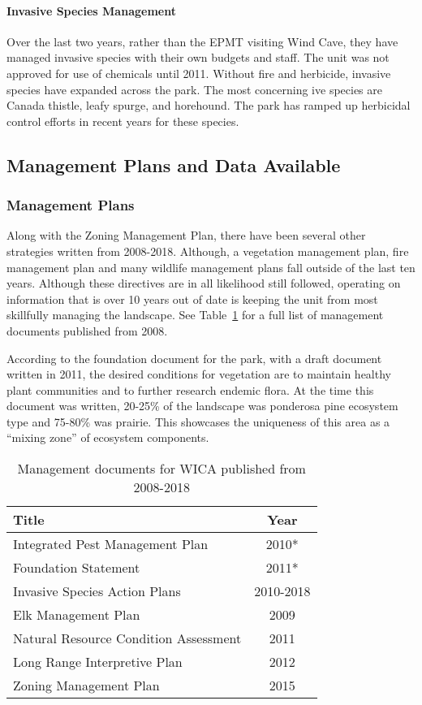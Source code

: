 \paragraph{Invasive Species Management}
Over the last two years, rather than the EPMT visiting Wind Cave, they have managed invasive species with their own budgets and staff. 
The unit was not approved for use of chemicals until 2011.
Without fire and herbicide, invasive species have expanded across the park. 
The most concerning ive species are Canada thistle, leafy spurge, and horehound. 
The park has ramped up herbicidal control efforts in recent years for these species.

\subsection{Management Plans and Data Available}

\subsubsection{Management Plans}

Along with the Zoning Management Plan, there have been several other strategies written from 2008-2018. 
Although, a vegetation management plan, fire management plan and many wildlife management plans fall outside of the last ten years. 
Although these directives are in all likelihood still followed, operating on information that is over 10 years out of date is keeping the unit from most skillfully managing the
landscape. 
See Table~\ref{tab:WICAmandocs} for a full list of management documents published from 2008.

According to the foundation document for the park, with a draft document written in 2011, the desired conditions for vegetation are to maintain healthy plant communities and to further research endemic flora. 
At the time this document was written, 20-25\% of the landscape was ponderosa
pine ecosystem type and 75-80\% was prairie. 
This showcases the uniqueness of this area as a ``mixing zone'' of ecosystem components.

\begin{table}[h]
	\centering
\caption[WICA Management documents]
	{Management documents for WICA published from 2008-2018}
\label{tab:WICAmandocs}
\begin{tabular}{lc}
	\toprule
	Title & Year\tabularnewline
	\midrule
Integrated Pest Management Plan & 2010* \tabularnewline
Foundation Statement & 2011* \tabularnewline
Invasive Species Action Plans & 2010-2018 \tabularnewline
Elk Management Plan & 2009 \tabularnewline
Natural Resource Condition Assessment & 2011 \tabularnewline
Long Range Interpretive Plan & 2012 \tabularnewline
Zoning Management Plan & 2015 \tabularnewline
\bottomrule
\end{tabular}
\end{table}

